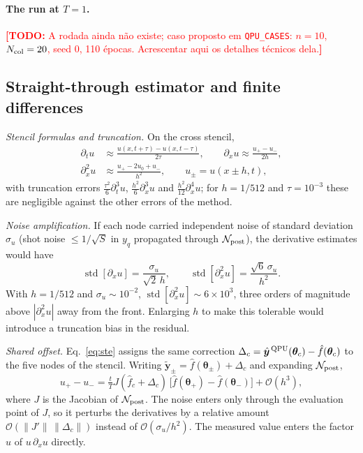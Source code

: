 \documentclass[floatfix,aps,pra,twocolumn,superscriptaddress,10pt,nofootinbib]{revtex4-2}
\newif\ifshowtodos \showtodostrue
\newcommand{\TODO}[1]{\ifshowtodos\textcolor{red}{\textbf{[TODO:} #1\textbf{]}}\fi}
\newcommand{\Ncol}{N_{\rm col}}
\begin{document}
\begin{appendices}
\paragraph{The run at $T=1$.} \TODO{A rodada ainda n\~ao existe; caso proposto em \texttt{QPU\_CASES}: $n=10$, $\Ncol=20$, seed 0, 110 \'epocas. Acrescentar aqui os detalhes t\'ecnicos dela.}

\subsection{Straight-through estimator and finite differences}\label{app:ste}
\emph{Stencil formulas and truncation.} On the cross stencil,
\begin{align}
  \partial_tu&\approx\frac{u(x,t+\tau)-u(x,t-\tau)}{2\tau},\qquad \partial_xu\approx\frac{u_{+}-u_{-}}{2h},\nonumber\\
  \partial_x^2u&\approx\frac{u_{+}-2u_0+u_{-}}{h^2},\qquad u_\pm=u(x\pm h,t),
\end{align}
with truncation errors $\tfrac{\tau^2}{6}\partial_t^3u$, $\tfrac{h^2}{6}\partial_x^3u$ and $\tfrac{h^2}{12}\partial_x^4u$; for $h=1/512$ and $\tau=10^{-3}$ these are negligible against the other errors of the method.

\emph{Noise amplification.} If each node carried independent noise of standard deviation $\sigma_u$ (shot noise $\le1/\sqrt S$ in $y_q$ propagated through $\mathcal N_{\rm post}$), the derivative estimates would have
\begin{equation}
  \operatorname{std}[\partial_xu]=\frac{\sigma_u}{\sqrt2\,h},\qquad \operatorname{std}[\partial_x^2u]=\frac{\sqrt6\,\sigma_u}{h^2}.
\end{equation}
With $h=1/512$ and $\sigma_u\sim10^{-2}$, $\operatorname{std}[\partial_x^2u]\sim6\times10^3$, three orders of magnitude above $|\partial_x^2u|$ away from the front. Enlarging $h$ to make this tolerable would introduce a truncation bias in the residual.

\emph{Shared offset.} Eq.~\eqref{eq:ste} assigns the same correction $\Delta_c=\hat{\bm y}^{\,\rm QPU}(\bm\theta_c)-\hat f(\bm\theta_c)$ to the five nodes of the stencil. Writing $\tilde{\bm y}_\pm=\hat f(\bm\theta_\pm)+\Delta_c$ and expanding $\mathcal N_{\rm post}$,
\begin{equation}
  u_+-u_-=\tfrac{t}{T}J(\hat f_c+\Delta_c)\,\big[\hat f(\bm\theta_+)-\hat f(\bm\theta_-)\big]+\mathcal O(h^3),
\end{equation}
where $J$ is the Jacobian of $\mathcal N_{\rm post}$. The noise enters only through the evaluation point of $J$, so it perturbs the derivatives by a relative amount $\mathcal O(\|J'\|\,\|\Delta_c\|)$ instead of $\mathcal O(\sigma_u/h^2)$. The measured value enters the factor $u$ of $u\,\partial_xu$ directly.


\end{appendices}
\end{document}
